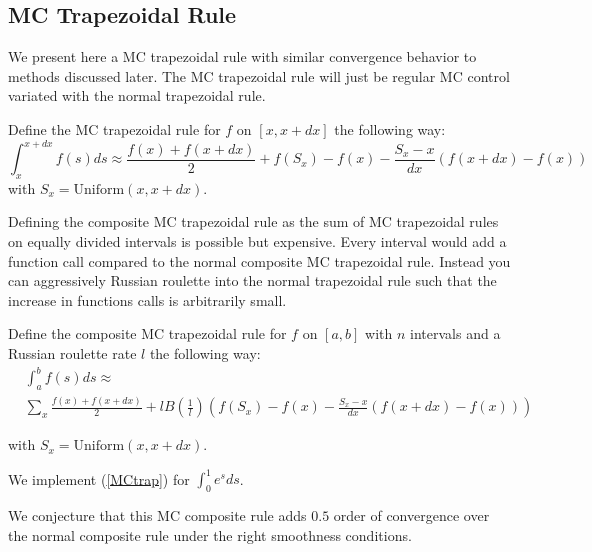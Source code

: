\documentclass[a4paper,12pt]{article}
\begin{document}
\subsection{MC Trapezoidal Rule}
We present here a MC trapezoidal rule with similar convergence behavior to
methods discussed later. The MC trapezoidal rule will just be
regular MC control variated with the normal trapezoidal rule.

\begin{definition}
    Define the MC trapezoidal rule for $f$ on $[x,x+dx]$ the following
    way:
    \begin{equation}
        \int_{x}^{x+dx} f(s)ds \approx
        \frac{f(x)+f(x+dx)}{2} + f(S_{x})-f(x)-\frac{S_{x}-x}{dx}(f(x+dx)-f(x))
    \end{equation}
    with $S_{x} = \text{Uniform}(x,x+dx)$.
\end{definition}


Defining the composite MC trapezoidal rule as
the sum of MC trapezoidal rules on equally divided intervals
is possible but expensive. Every interval would add a function call
compared to the normal composite MC trapezoidal rule. Instead
you can aggressively Russian roulette into the normal trapezoidal rule
such that the increase in functions calls is arbitrarily small.

\begin{definition} \label{MCtrap}
    Define the composite MC trapezoidal rule for $f$ on $[a,b]$ with
    $n$ intervals and a Russian roulette rate $l$ the following way:
    \begin{align}
         & \int_{a}^{b} f(s)ds \approx        \\
         & \sum_{x}  \frac{f(x)+f(x+dx)}{2} +
        l B \left(\frac{1}{l} \right)
        \left(f(S_{x})-f(x)-\frac{S_{x}-x}{dx}(f(x+dx)-f(x)) \right)
    \end{align}

    with $S_{x} = \text{Uniform}(x,x+dx)$.

\end{definition}

\begin{pythonn}
    We implement (\ref{MCtrap}) for $\int_{0}^{1}e^{s}ds$.
    \vspace*{0.5cm}
\end{pythonn}

We conjecture that this MC composite rule adds $0.5$ order of
convergence over the normal composite rule under the
right smoothness conditions.
\end{document}

